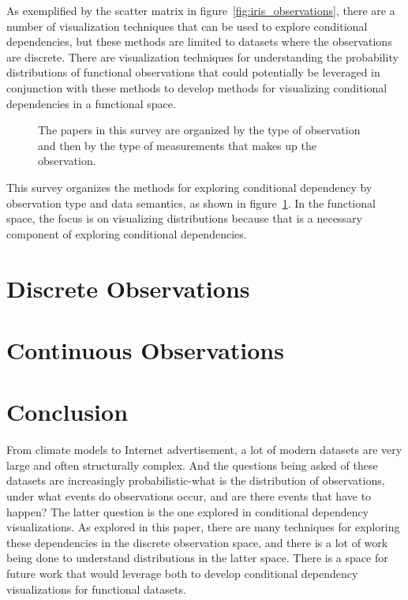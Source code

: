 \documentclass[letterpaper,onecolumn,titlepage]{Ythesis}
\begin{document}
As exemplified by the scatter matrix\cite{elmqvist_rolling_2008,l._wilkinson_high-dimensional_2006} in figure~\ref{fig:iris_observations}, there are a number of visualization techniques that can be used to explore conditional dependencies, but these methods are limited to datasets where the observations are discrete. There are visualization techniques for understanding the probability distributions of functional observations that could potentially be leveraged in conjunction with these methods to develop methods for visualizing conditional dependencies in a functional space.


\begin{figure}

\caption{The papers in this survey are organized by the type of observation and then by the type of measurements that makes up the observation.}
\label{fig:papermap}
\end{figure}

 This survey organizes the methods for exploring conditional dependency by observation type and data semantics, as shown in figure~\ref{fig:papermap}. In the functional space, the focus is on visualizing distributions because that is a necessary component of exploring conditional dependencies. 





\section{Discrete Observations}



\section{Continuous Observations}


\section{Conclusion}
\label{sec:conclusion}

From climate models to Internet advertisement, a lot of modern datasets are very large and often structurally complex. And the questions being asked of these datasets are increasingly probabilistic-what is the distribution of observations, under what events do observations occur, and are there events that have to happen? The latter question is the one explored in conditional dependency visualizations. As explored in this paper, there are many techniques for exploring these dependencies in the discrete observation space, and there is a lot of work being done to understand distributions in the latter space. There is a space for future work that would leverage both to develop conditional dependency visualizations for functional datasets. 

\printbibliography
\end{document}
